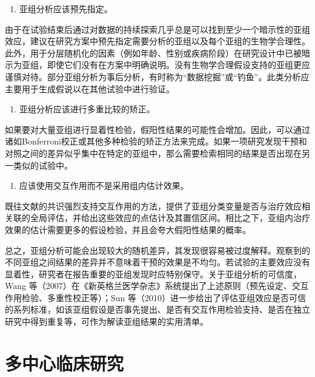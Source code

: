 \documentclass[
  chinese-hans,
  letterpaper,
  DIV=11,
  numbers=noendperiod]{scrreprt}
\providecommand{\tightlist}{%
  \setlength{\itemsep}{0pt}\setlength{\parskip}{0pt}}
\begin{document}
\begin{enumerate}
\def\labelenumi{\arabic{enumi}.}
\tightlist
\item
  亚组分析应该预先指定。
\end{enumerate}

由于在试验结束后通过对数据的持续探索几乎总是可以找到至少一个暗示性的亚组效应，建议在研究方案中预先指定需要分析的亚组以及每个亚组的生物学合理性。此外，用于分层随机化的因素（例如年龄、性别或疾病阶段）在研究设计中已被暗示为亚组，即使它们没有在方案中明确说明。没有生物学合理假设支持的亚组更应谨慎对待。部分亚组分析为事后分析，有时称为``数据挖掘''或``钓鱼''。此类分析应主要用于生成假说以在其他试验中进行验证。

\begin{enumerate}
\def\labelenumi{\arabic{enumi}.}
\setcounter{enumi}{1}
\tightlist
\item
  亚组分析应该进行多重比较的矫正。
\end{enumerate}

如果要对大量亚组进行显着性检验，假阳性结果的可能性会增加。因此，可以通过诸如Bonferroni校正或其他多种检验的矫正方法来完成。如果一项研究发现干预和对照之间的差异似乎集中在特定的亚组中，那么需要检索相同的结果是否出现在另一类似的试验中。

\begin{enumerate}
\def\labelenumi{\arabic{enumi}.}
\setcounter{enumi}{2}
\tightlist
\item
  应该使用交互作用而不是采用组内估计效果。
\end{enumerate}

既往文献的共识强烈支持交互作用的方法，提供了亚组分类变量是否与治疗效应相关联的全局评估，并给出这些效应的点估计及其置信区间。相比之下，亚组内治疗效果的估计需要更多的假设检验，并且会夸大假阳性结果的概率。

总之，亚组分析可能会出现较大的随机差异，其发现很容易被过度解释。观察到的不同亚组之间结果的差异并不意味着干预的效果是不均匀。若试验的主要效应没有显着性，研究者在报告重要的亚组发现时应特别保守。关于亚组分析的可信度，Wang
等（2007）在《新英格兰医学杂志》系统提出了上述原则（预先设定、交互作用检验、多重性校正等）；Sun
等（2010）进一步给出了评估亚组效应是否可信的系列标准，如该亚组假设是否事先提出、是否有交互作用检验支持、是否在独立研究中得到重复等，可作为解读亚组结果的实用清单。

\section{多中心临床研究}\label{ux591aux4e2dux5fc3ux4e34ux5e8aux7814ux7a76}
\end{document}
